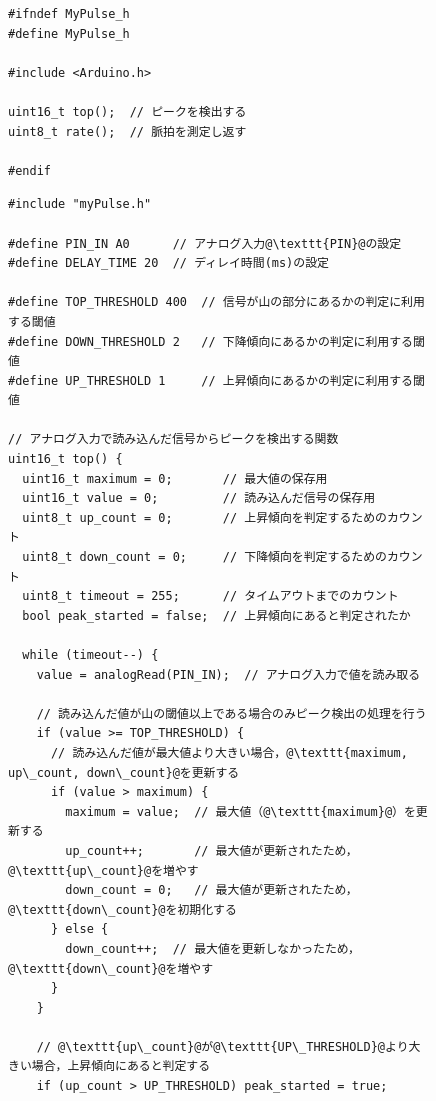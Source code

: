 \begin{figure}[H]
  \begin{lstlisting}[caption=myPulse.h, label=b3_myPulse.h, escapechar=\@]
#ifndef MyPulse_h
#define MyPulse_h

#include <Arduino.h>

uint16_t top();  // ピークを検出する
uint8_t rate();  // 脈拍を測定し返す

#endif
    \end{lstlisting}
\end{figure}

\begin{figure}[H]
  \begin{lstlisting}[caption=myPulse.cpp（前半：top関数によるピーク検出処理）, label=b3_myPulse.cpp_top, escapechar=\@]
#include "myPulse.h"

#define PIN_IN A0      // アナログ入力@\texttt{PIN}@の設定
#define DELAY_TIME 20  // ディレイ時間(ms)の設定

#define TOP_THRESHOLD 400  // 信号が山の部分にあるかの判定に利用する閾値
#define DOWN_THRESHOLD 2   // 下降傾向にあるかの判定に利用する閾値
#define UP_THRESHOLD 1     // 上昇傾向にあるかの判定に利用する閾値

// アナログ入力で読み込んだ信号からピークを検出する関数
uint16_t top() {
  uint16_t maximum = 0;       // 最大値の保存用
  uint16_t value = 0;         // 読み込んだ信号の保存用
  uint8_t up_count = 0;       // 上昇傾向を判定するためのカウント
  uint8_t down_count = 0;     // 下降傾向を判定するためのカウント
  uint8_t timeout = 255;      // タイムアウトまでのカウント
  bool peak_started = false;  // 上昇傾向にあると判定されたか

  while (timeout--) {
    value = analogRead(PIN_IN);  // アナログ入力で値を読み取る

    // 読み込んだ値が山の閾値以上である場合のみピーク検出の処理を行う
    if (value >= TOP_THRESHOLD) {
      // 読み込んだ値が最大値より大きい場合，@\texttt{maximum, up\_count, down\_count}@を更新する
      if (value > maximum) {
        maximum = value;  // 最大値（@\texttt{maximum}@）を更新する
        up_count++;       // 最大値が更新されたため，@\texttt{up\_count}@を増やす
        down_count = 0;   // 最大値が更新されたため，@\texttt{down\_count}@を初期化する
      } else {
        down_count++;  // 最大値を更新しなかったため，@\texttt{down\_count}@を増やす
      }
    }

    // @\texttt{up\_count}@が@\texttt{UP\_THRESHOLD}@より大きい場合，上昇傾向にあると判定する
    if (up_count > UP_THRESHOLD) peak_started = true;


\end{lstlisting}
\end{figure}
